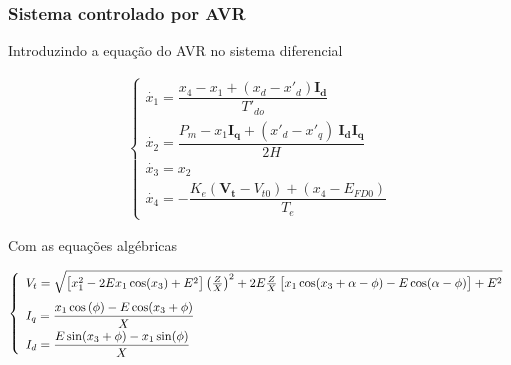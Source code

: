 \documentclass[10pt, compress,xcolor={svgnames,dvipsnames,x11names}]{beamer}
\begin{document}
\begin{frame}%
\frametitle{Sistema controlado por AVR}
\scriptsize

	Introduzindo a equação do AVR no sistema diferencial

\begin{align}
\begin{cases}
\dot{x_1} = \dfrac{x_4 - x_1 + \left(x_d - x'_d\right)\mathbf{I_d}}{T'_{do}} \\[5mm]
%
\dot{x_2} = \dfrac{P_m - x_1 \mathbf{I_q} + \left(x'_d - x'_q\right)\ \mathbf{I_d I_q}}{2H} \\[5mm]
%
\dot{x_3} = x_2 \\[5mm]
%
\dot{x_4} = - \dfrac{ K_e\left(\mathbf{V_t} - V_{t0}\right) + (x_4 - E_{FD0})}{T_e}
\end{cases} \label{sis::sistemaDiferencialAVR}
\end{align}	

	Com as equações algébricas

\begin{align} \label{sis::sistemaDiferencialMalhaAberta}
\left\{ \begin{array}{l}
V_t = \sqrt{\left[  x_1^2 - 2Ex_1\cos(x_3) +E^2 \vphantom{\int} \right] \left( \frac{Z}{X} \right)^2 + 2E\frac{Z}{X}\left[ \vphantom{\int} x_1\cos(x_3 + \alpha - \phi) - E\cos(\alpha - \phi) \vphantom{\int}\right] + E^2 } \\[3mm]
%
I_q = \dfrac{x_1\cos\left(\phi\right) - E\cos(x_3 + \phi) }{X} \\[2mm]
%
I_d = \dfrac{E\sin(x_3 + \phi) - x_1\sin(\phi) }{X}
\end{array}\right.
\end{align}

\normalsize
\end{frame}%
\end{document}
